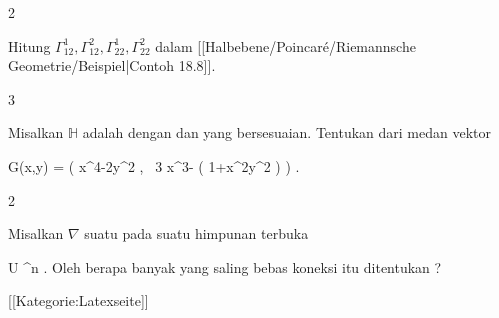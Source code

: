 {2}
{

Hitung $\Gamma^1_{12},  \Gamma^2_{12},  \Gamma^1_{22},  \Gamma^2_{22}$ dalam
[[Halbebene/Poincaré/Riemannsche Geometrie/Beispiel|Contoh 18.8]].

}
{} {}

{3}
{

Misalkan ${\mathbb H}$ adalah
dengan
dan
yang bersesuaian. Tentukan
 dari medan vektor

\mavergleichskettedisp
{\vergleichskette
{ G(x,y)
}
{ =} { \left(  x^4-2y^2  , \,   3 x^3-  \ln  \left(  1+x^2y^2 \right)                   \right)
}
{ } {
}
{ } {
}
{ } {
}
}
{}{}{.}

}
{} {}

{2}
{

Misalkan $\nabla$ suatu
pada suatu himpunan terbuka

\mavergleichskette
{\vergleichskette
{ U
}
{ \subseteq }{ \R^n
}
{  }{
}
{    }{
}
{   }{
}
}
{}{}{.}
Oleh berapa banyak
yang saling bebas koneksi itu ditentukan
 {} {}?

}
{} {}

 [[Kategorie:Latexseite]]
